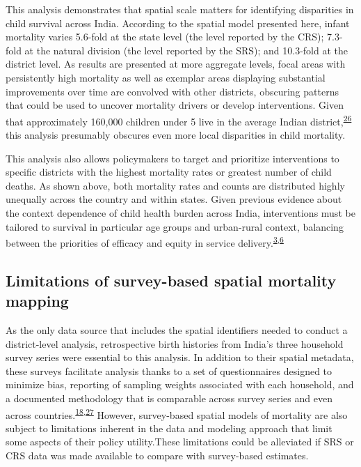 \documentclass[
]{article}
\begin{document}
This analysis demonstrates that spatial scale matters for identifying disparities in child survival across India. According to the spatial model presented here, infant mortality varies 5.6-fold at the state level (the level reported by the CRS); 7.3-fold at the natural division (the level reported by the SRS); and 10.3-fold at the district level. As results are presented at more aggregate levels, focal areas with persistently high mortality as well as exemplar areas displaying substantial improvements over time are convolved with other districts, obscuring patterns that could be used to uncover mortality drivers or develop interventions. Given that approximately 160,000 children under 5 live in the average Indian district,\textsuperscript{\protect\hyperlink{ref-Tatem2017}{26}} this analysis presumably obscures even more local disparities in child mortality.

This analysis also allows policymakers to target and prioritize interventions to specific districts with the highest mortality rates or greatest number of child deaths. As shown above, both mortality rates and counts are distributed highly unequally across the country and within states. Given previous evidence about the context dependence of child health burden across India, interventions must be tailored to survival in particular age groups and urban-rural context, balancing between the priorities of efficacy and equity in service delivery.\textsuperscript{\protect\hyperlink{ref-IND_MOHFW2017a}{3},\protect\hyperlink{ref-Dandona2017}{6}}

\hypertarget{limitations-of-survey-based-spatial-mortality-mapping}{%
\subsection{Limitations of survey-based spatial mortality mapping}\label{limitations-of-survey-based-spatial-mortality-mapping}}

As the only data source that includes the spatial identifiers needed to conduct a district-level analysis, retrospective birth histories from India's three household survey series were essential to this analysis. In addition to their spatial metadata, these surveys facilitate analysis thanks to a set of questionnaires designed to minimize bias, reporting of sampling weights associated with each household, and a documented methodology that is comparable across survey series and even across countries.\textsuperscript{\protect\hyperlink{ref-Dandona2016}{18},\protect\hyperlink{ref-Corsi2012}{27}} However, survey-based spatial models of mortality are also subject to limitations inherent in the data and modeling approach that limit some aspects of their policy utility.These limitations could be alleviated if SRS or CRS data was made available to compare with survey-based estimates.
\end{document}
